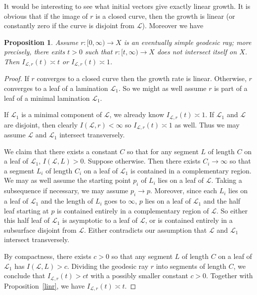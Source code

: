 \documentclass[11pt]{article} %
\theoremstyle{plain}
\newtheorem{prop}[thm]{Proposition}
\theoremstyle{definition}
\numberwithin{equation}{section}
\begin{document}
It would be interesting to see what initial vectors give exactly linear growth. It is obvious that if the image of $r$ is a closed curve, then the growth is linear (or constantly zero if the curve is disjoint from $\mathcal{L}$). Moreover we have
\begin{prop}\label{prop:leaf}
Assume $r:[0, \infty) \rightarrow X$ is an eventually simple geodesic ray; more precisely, there exits $t>0$ such that $r:[t, \infty) \to X$ does not intersect itself on $X$. Then $I_{\mathcal{L},r}(t)\asymp t$ or $I_{\mathcal{L},r}(t)\asymp 1$.
\end{prop}
\begin{proof}
If $r$ converges to a closed curve then the growth rate is linear. Otherwise, $r$ converges to a leaf of a lamination $\mathcal{L}_1$. So we might as well assume $r$ is part of a leaf of a minimal lamination $\mathcal{L}_1$.

If $\mathcal{L}_1$ is a minimal component of $\mathcal{L}$, we already know $I_{\mathcal{L},r}(t)\asymp 1$. If $\mathcal{L}_1$ and $\mathcal{L}$ are disjoint, then clearly $I(\mathcal{L},r)<\infty$ so $I_{\mathcal{L},r}(t)\asymp1$ as well. Thus we may assume $\mathcal{L}$ and $\mathcal{L}_1$ intersect transversely.

We claim that there exists a constant $C$ so that for any segment $L$ of length $C$ on a leaf of $\mathcal{L}_1$, $I(\mathcal{L},L)>0$. Suppose otherwise. Then there exists $C_i\to\infty$ so that a segment $L_i$ of length $C_i$ on a leaf of $\mathcal{L}_1$ is contained in a complementary region. We may as well assume the starting point $p_i$ of $L_i$ lies on a leaf of $\mathcal{L}$. Taking a subsequence if necessary, we may assume $p_i\to p$. Moreover, since each $L_i$ lies on a leaf of $\mathcal{L}_1$ and the length of $L_i$ goes to $\infty$, $p$ lies on a leaf of $\mathcal{L}_1$ and the half leaf starting at $p$ is contained entirely in a complementary region of $\mathcal{L}$. So either this half leaf of $\mathcal{L}_1$ is asymptotic to a leaf of $\mathcal{L}$, or is contained entirely in a subsurface disjoint from $\mathcal{L}$. Either contradicts our assumption that $\mathcal{L}$ and $\mathcal{L}_1$ intersect transversely.

By compactness, there exists $c>0$ so that any segment $L$ of length $C$ on a leaf of $\mathcal{L}_1$ has $I(\mathcal{L},L)>c$. Dividing the geodesic ray $r$ into segments of length $C$, we conclude that $I_{\mathcal{L},r}(t)>ct$ with a possibly smaller constant $c>0$. Together with Proposition~\ref{linr}, we have $I_{\mathcal{L},r}(t)\asymp t$.
\end{proof}
\end{document}
